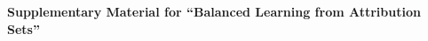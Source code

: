 \documentclass[twoside]{article}
\newcommand{\1}{\mathbf 1}
\begin{document}
\runningauthor{}

\onecolumn
\begin{center}
{\large\bf Supplementary Material for ``Balanced Learning from Attribution Sets''}
\end{center}

\appendix



\end{document}

